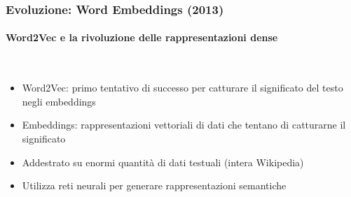 %
\begin{frame}[t,fragile] \frametitle{Evoluzione: Word Embeddings (2013)}
	{\scriptsize
		\onslide<1->
            \framesubtitle{Word2Vec e la rivoluzione delle rappresentazioni dense}
            \vspace*{-15pt}
            \begin{minipage}[t]{\textwidth}
            \end{minipage}
            \\\vspace*{3pt}
	    	\begin{minipage}[t]{\textwidth}
				\begin{minipage}[t]{0.6\textwidth}
	    			\begin{itemize}[leftmargin=10pt,align=right]
						\onslide<2->\item[\alert{\faHandORight}] \alert{Word2Vec:} primo tentativo di successo per catturare il significato del testo negli embeddings
						\onslide<3->\item[\alert{\faHandORight}] \alert{Embeddings:} rappresentazioni vettoriali di dati che tentano di catturarne il significato
						\onslide<4->\item[\alert{\faHandORight}] Addestrato su \alert{enormi quantità} di dati testuali (intera Wikipedia)
						\onslide<5->\item[\alert{\faHandORight}] Utilizza \alert{reti neurali} per generare rappresentazioni semantiche
					\end{itemize}
            	\end{minipage}
            	\begin{minipage}[t]{0.4\textwidth}
            	\end{minipage}
	    	\end{minipage}
	}
\end{frame}
